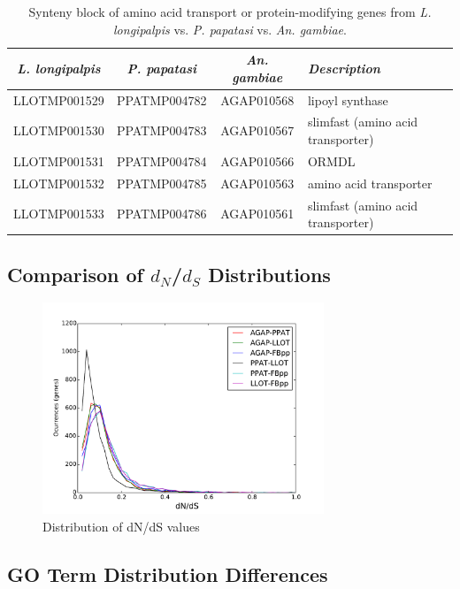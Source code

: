 \begin{table}[H]
  \centering
  \begin{tabular}{c c c l} \hline
    \emph{L. longipalpis} & \emph{P. papatasi} & \emph{An. gambiae} & \emph{Description} \\ \hline
    LLOTMP001529 & PPATMP004782 & AGAP010568 & lipoyl synthase \\
    LLOTMP001530 & PPATMP004783 & AGAP010567 & slimfast (amino acid transporter) \\
    LLOTMP001531 & PPATMP004784 & AGAP010566 & ORMDL \\
    LLOTMP001532 & PPATMP004785 & AGAP010563 & amino acid transporter \\
    LLOTMP001533 & PPATMP004786 & AGAP010561 & slimfast (amino acid transporter)
    \end{tabular}
    \caption{Synteny block of amino acid transport or protein-modifying genes from \emph{L. longipalpis} vs. \emph{P. papatasi} vs. \emph{An. gambiae}.}
  \label{tab:synteny-three-way-amino}
\end{table}

\subsection{Comparison of $d_N$/$d_S$ Distributions}
\begin{figure}[H]
  \centering
  \includegraphics[width=0.75\textwidth]{figures/ka_ks/dN_dS}
  \caption{Distribution of dN/dS values}
  \label{fig:dnds-distr}
\end{figure}

\subsection{GO Term Distribution Differences}

